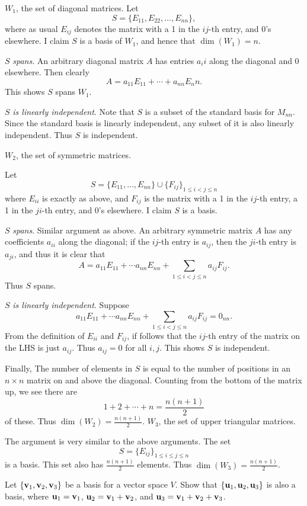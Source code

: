 \begin{solution}
\bb[(i)]
\ii $W_1$, the set of diagonal matrices.  
Let 
\[
S=\{E_{11}, E_{22}, \dots , E_{nn}\},
\]
where as usual $E_{ij}$ denotes the matrix with a 1 in the $ij$-th entry, and 0's elsewhere. I claim $S$ is a basis of $W_1$, and hence that $\boxed{\dim(W_1)=n}$. 

$S$ {\em spans}. An arbitrary diagonal matrix $A$ has entries $a_ii$ along the diagonal and 0 elsewhere. Then clearly 
\[
A=a_{11}E_11+\cdots +a_{nn}E_nn.
\]
This shows $S$ spans $W_1$. 

$S$ {\em is linearly independent}. Note that $S$ is a subset of the standard basis for $M_{nn}$. Since the standard basis is linearly independent, any subset of it is also linearly independent. Thus $S$ is independent.

\ii $W_2$, the set of symmetric matrices. 

Let
\[
S=\{E_{11},\dots ,E_{nn}\}\cup\{F_{ij}\}_{1\leq i<j\leq n}
\]
where $E_{ii}$ is exactly as above, and $F_{ij}$ is the matrix with a 1 in the $ij$-th entry, a 1 in the $ji$-th entry, and 0's elsewhere. I claim $S$ is a basis. 

$S$ {\em spans}. Similar argument as above. An arbitrary symmetric matrix $A$ has any coefficients $a_{ii}$ along the diagonal; if the $ij$-th entry is $a_{ij}$, then the $ji$-th entry is $a_{ji}$, and thus it is clear that 
\[
A=a_{11}E_{11}+\cdots a_{nn}E_{nn}+\sum_{1\leq i<j\leq n}a_{ij}F_{ij}.
\]
Thus $S$ spans. 

$S$ {\em is linearly independent}. Suppose 
\[
a_{11}E_{11}+\cdots a_{nn}E_{nn}+\sum_{1\leq i<j\leq n}a_{ij}F_{ij}=0_{nn}.
\]
From the definition of $E_{ii}$ and $F_{ij}$, if follows that the $ij$-th entry of the matrix on the LHS is just $a_{ij}$. Thus $a_{ij}=0$ for all $i,j$. This shows $S$ is independent. 

Finally, The number of elements in $S$ is equal to the number of positions in an $n\times n$ matrix on and above the diagonal. Counting from the bottom of the matrix up, we see there are 
\[
1+2+\cdots +n=\frac{n(n+1)}{2}
\]
of these. Thus $\boxed{\dim(W_2)=\frac{n(n+1)}{2}}$. 
\ii $W_3$, the set of upper triangular matrices. 

The argument is very similar to the above arguments. The set 
\[
S=\{E_{ij}\}_{1\leq i\leq j\leq n}
\]
is a basis. This set also has $\frac{n(n+1)}{2}$ elements. Thus $\boxed{\dim(W_3)=\frac{n(n+1)}{2}}$.
\ee
\end{solution}
\ii Let $\{{\mathbf v}_1,{\mathbf v}_2,{\mathbf v}_3\}$ be a basis for a vector space $V$. Show that $\{{\mathbf u}_1,{\mathbf u}_2,{\mathbf u}_3\}$ is also a basis, where ${\mathbf u}_1 = {\mathbf v}_1$, ${\mathbf u}_2 = {\mathbf v}_1 + {\mathbf v}_2$, and ${\mathbf u}_3 = {\mathbf v}_1 +{\mathbf v}_2 + {\mathbf v}_3$.
